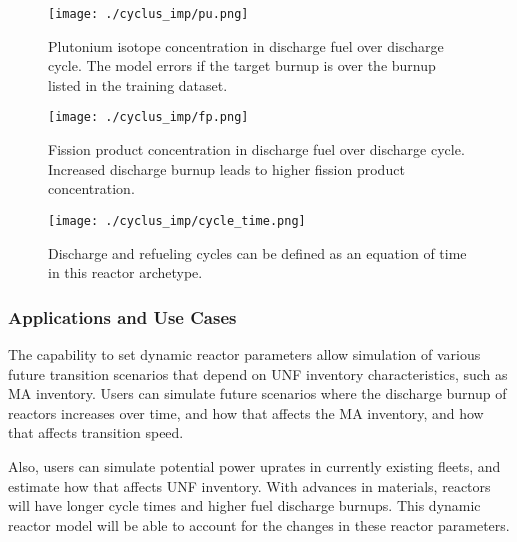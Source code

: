 \begin{figure}
    \centering
    \texttt{[image: ./cyclus\_imp/pu.png]}
    \caption{Plutonium isotope concentration in discharge fuel over discharge cycle. The model errors if the target burnup
    is over the burnup listed in the training dataset.}
    \label{fig:cyclus_pu}
\end{figure}


\begin{figure}
    \centering
    \texttt{[image: ./cyclus\_imp/fp.png]}
    \caption{Fission product concentration in discharge fuel over discharge cycle. Increased discharge burnup leads to higher fission product concentration.}
    \label{fig:cyclus_fp}
\end{figure}

\begin{figure}
    \centering
    \texttt{[image: ./cyclus\_imp/cycle\_time.png]}
    \caption{Discharge and refueling cycles can be defined as an equation of time in this reactor archetype.}
    \label{fig:cyclus_time}
\end{figure}

\subsubsection{Applications and Use Cases}

The capability to set dynamic reactor parameters
allow simulation of various future transition scenarios
that depend on \gls{UNF} inventory characteristics,
such as \gls{MA} inventory. 
Users can simulate future scenarios where the discharge
burnup of reactors increases over time, and how that
affects the \gls{MA} inventory, and how that affects
transition speed. 

Also, users can simulate potential
power uprates in currently existing fleets, and
estimate how that affects \gls{UNF} inventory. With
advances in materials, reactors will have longer
cycle times and higher fuel discharge burnups.
This dynamic reactor model will be able to account
for the changes in these reactor parameters.

\FloatBarrier